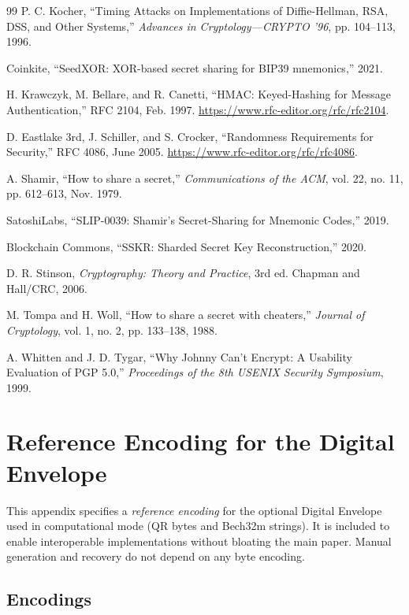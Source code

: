 \documentclass[11pt]{article}
\begin{document}
\begin{thebibliography}{99}
P. C. Kocher,
``Timing Attacks on Implementations of Diffie-Hellman, RSA, DSS, and Other Systems,''
\textit{Advances in Cryptology—CRYPTO '96}, pp. 104--113, 1996.

Coinkite,
``SeedXOR: XOR-based secret sharing for BIP39 mnemonics,'' 2021.

H. Krawczyk, M. Bellare, and R. Canetti,
``HMAC: Keyed-Hashing for Message Authentication,''
RFC 2104, Feb. 1997. \url{https://www.rfc-editor.org/rfc/rfc2104}.

D. Eastlake 3rd, J. Schiller, and S. Crocker,
``Randomness Requirements for Security,''
RFC 4086, June 2005. \url{https://www.rfc-editor.org/rfc/rfc4086}.

A. Shamir,
``How to share a secret,''
\textit{Communications of the ACM}, vol. 22, no. 11, pp. 612--613, Nov. 1979.

SatoshiLabs,
``SLIP-0039: Shamir's Secret-Sharing for Mnemonic Codes,'' 2019.

Blockchain Commons,
``SSKR: Sharded Secret Key Reconstruction,'' 2020.

D. R. Stinson,
\textit{Cryptography: Theory and Practice}, 3rd ed.
Chapman and Hall/CRC, 2006.

M. Tompa and H. Woll,
``How to share a secret with cheaters,''
\textit{Journal of Cryptology}, vol. 1, no. 2, pp. 133--138, 1988.

A. Whitten and J. D. Tygar,
``Why Johnny Can't Encrypt: A Usability Evaluation of PGP 5.0,''
\textit{Proceedings of the 8th USENIX Security Symposium}, 1999.

\end{thebibliography}

\appendix

\section{Reference Encoding for the Digital Envelope}
\label{app:encoding}

This appendix specifies a \textit{reference encoding} for the optional Digital Envelope used in computational mode (QR bytes and Bech32m strings). It is included to enable interoperable implementations without bloating the main paper. Manual generation and recovery do not depend on any byte encoding.

\subsection{Encodings}
\end{document}
